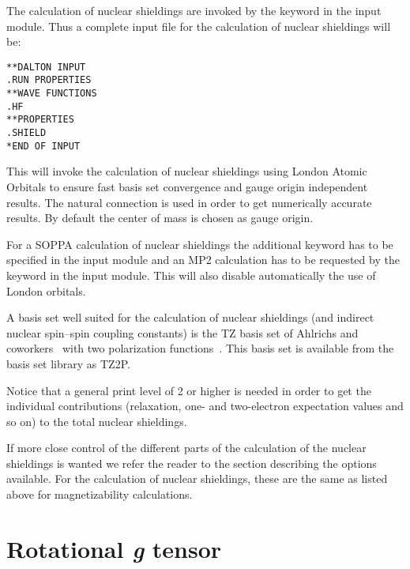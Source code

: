 The calculation of nuclear shieldings are
invoked by the
keyword  in the  input module. Thus
a complete input file for the calculation of nuclear shieldings will
be:

\begin{verbatim}
**DALTON INPUT
.RUN PROPERTIES
**WAVE FUNCTIONS
.HF
**PROPERTIES
.SHIELD
*END OF INPUT
\end{verbatim}

This will invoke the calculation of nuclear shieldings using
London Atomic Orbitals to ensure fast basis set
convergence and gauge
origin independent results. The natural connection
\cite{joklbkrthpjtca90}
is used in order to get
numerically accurate results. By default the center of mass is chosen as gauge
origin.

For a SOPPA calculation of nuclear shieldings the additional 
keyword  has to be specified in the  input module 
and an MP2 calculation has to be requested by the keyword  in the 
 input module. This will also disable automatically
the use of London orbitals.

A basis set well suited for the calculation of nuclear shieldings (and
indirect nuclear spin--spin coupling constants) is the TZ basis set of
Ahlrichs and coworkers~\cite{ashhrajcp97,aschrajcp100} with two
polarization functions~\cite{thmjkrcr99}. This basis set is available
from the basis set library as TZ2P.

Notice that a general print level of 2 or higher is needed in order to
get the individual contributions (relaxation, one- and
two-electron expectation values and so on) to the total nuclear shieldings.

If more close control of the different parts of the calculation of the
nuclear shieldings is wanted we refer the reader to the section
describing the options available. For the calculation of nuclear
shieldings, these are the same as listed above for magnetizability
calculations.

\section{Rotational {\em g} tensor}\label{sec:gfac}

\begin{center}
\end{center}

